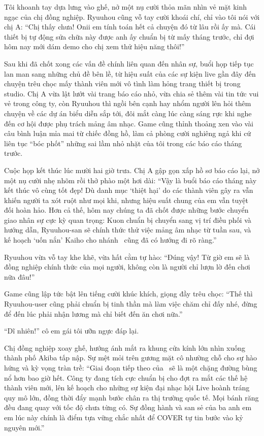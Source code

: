 \documentclass[../main.tex]{subfiles}
\begin{document}
Tôi khoanh tay dựa lưng vào ghế, nở một nụ cười thỏa mãn nhìn vẻ mặt kinh ngạc của chị đồng nghiệp. Ryuuhou cũng vỗ tay cười khoái chí, chỉ vào tôi nói với chị A: ``Chị thấy chưa! Onii em tính toán hết cả chuyện đó từ lâu rồi ấy mà. Cái thiết bị tự động sửa chữa này được anh ấy chuẩn bị từ mấy tháng trước, chỉ đợi hôm nay mới dám demo cho chị xem thử hiệu năng thôi!''

\ct

Sau khi đã chốt xong các vấn đề chính liên quan đến nhân sự, buổi họp tiếp tục lan man sang những chủ đề bên lề, từ hiệu suất của các sự kiện live gần đây đến chuyện trêu chọc mấy thành viên mới vô tình làm hỏng trang thiết bị trong studio. Chị A vừa lật lướt vài trang báo cáo nhỏ, vừa chia sẻ thêm vài tin tức vui vẻ trong công ty, còn Ryuuhou thì ngồi bên cạnh hay nhổm người lên hỏi thêm chuyện về các dự án biểu diễn sắp tới, đôi mắt càng lúc càng sáng rực khi nghe đến cơ hội được phụ trách mảng âm nhạc. Game cũng thỉnh thoảng xen vào vài câu bình luận mỉa mai từ chiếc đồng hồ, làm cả phòng cười nghiêng ngả khi cứ liên tục ``bóc phốt'' những sai lầm nhỏ nhặt của tôi trong các báo cáo tháng trước.

Cuộc họp kết thúc lúc mười hai giờ trưa. Chị A gập gọn xấp hồ sơ báo cáo lại, nở một nụ cười nhẹ nhõm rồi thở phào một hơi dài: ``Vậy là buổi báo cáo tháng này kết thúc vô cùng tốt đẹp! Dù danh mục `thiệt hại' do các thành viên gây ra vẫn khiến người ta xót ruột như mọi khi, nhưng hiệu suất chung của em vẫn tuyệt đối hoàn hảo. Hơn cả thế, hôm nay chúng ta đã chốt được những bước chuyển giao nhân sự cực kỳ quan trọng: Kuon chuẩn bị chuyển sang vị trí điều phối và hướng dẫn, Ryuuhou-san sẽ chính thức thử việc mảng âm nhạc từ tuần sau, và kế hoạch `uốn nắn' Kaiho cho nhánh \hls\ cũng đã có hướng đi rõ ràng.''

Ryuuhou vừa vỗ tay khe khẽ, vừa hất cằm tự hào: ``Đúng vậy! Từ giờ em sẽ là đồng nghiệp chính thức của mọi người, không còn là người chỉ lượn lờ đến chơi nữa đâu!''

Game cũng lập tức bật lên tiếng cười khúc khích, giọng đầy trêu chọc: ``Thế thì Ryuuhou-user cũng phải chuẩn bị tinh thần mà làm việc chăm chỉ đấy nhé, đừng để đến lúc phải nhận lương mà chỉ biết đến ăn chơi nữa.''

``Dĩ nhiên!'' cô em gái tôi ưỡn ngực đáp lại.

Chị đồng nghiệp xoay ghế, hướng ánh mắt ra khung cửa kính lớn nhìn xuống thành phố Akiba tấp nập. Sự mệt mỏi trên gương mặt cô nhường chỗ cho sự hào hứng và kỳ vọng tràn trề: ``Giai đoạn tiếp theo của \hll\ sẽ là một chặng đường bùng nổ hơn bao giờ hết. Công ty đang tích cực chuẩn bị cho đợt ra mắt các thế hệ thành viên mới, lên kế hoạch cho những sự kiện đại nhạc hội Live hoành tráng quy mô lớn, đồng thời đẩy mạnh bước chân ra thị trường quốc tế. Mọi bánh răng đều đang quay với tốc độ chưa từng có. Sự đồng hành và san sẻ của ba anh em em lúc này chính là điểm tựa vững chắc nhất để COVER tự tin bước vào kỷ nguyên mới.''
\end{document}
